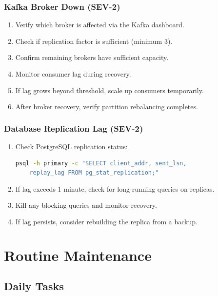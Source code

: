 \documentclass[
    language=english,
    doctype=manual,
    institution=none,
    titlestyle=book,
    oneside,
]{omnilatex}
\begin{document}
\subsection{Kafka Broker Down (SEV-2)}

\begin{enumerate}
    \item Verify which broker is affected via the Kafka dashboard.
    \item Check if replication factor is sufficient (minimum 3).
    \item Confirm remaining brokers have sufficient capacity.
    \item Monitor consumer lag during recovery.
    \item If lag grows beyond threshold, scale up consumers temporarily.
    \item After broker recovery, verify partition rebalancing completes.
\end{enumerate}

\subsection{Database Replication Lag (SEV-2)}

\begin{enumerate}
    \item Check PostgreSQL replication status:
    \begin{lstlisting}[language=bash]
psql -h primary -c "SELECT client_addr, sent_lsn,
    replay_lag FROM pg_stat_replication;"
    \end{lstlisting}
    \item If lag exceeds 1 minute, check for long-running queries on
        replicas.
    \item Kill any blocking queries and monitor recovery.
    \item If lag persists, consider rebuilding the replica from a backup.
\end{enumerate}

\chapter{Routine Maintenance}
\label{sec:maintenance}

\section{Daily Tasks}
\end{document}
